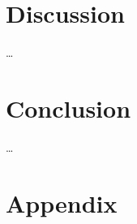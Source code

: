 \documentclass[%
a4paper, 12pt, DIV=calc, BCOR5mm,abstracton]{scrartcl}
\newcounter{SeitenzahlSpeicher}
\begin{document}
\section{Discussion} \label{ch:Disc}
\dots%

\section{Conclusion} \label{ch:Conc}
\dots%

	

\clearpage
{}
\setcounter{page}{\theSeitenzahlSpeicher}
\appendix

\section{Appendix}


	
\newpage
\printbibliography 
%
%
%
%
\end{document}

